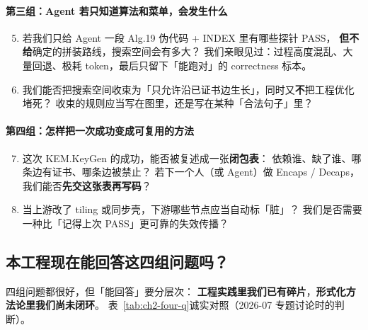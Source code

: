 \documentclass[UTF8,a4paper,11pt]{ctexart}
\theoremstyle{definition}
\theoremstyle{plain}
\theoremstyle{remark}
\numberwithin{figure}{section}
\numberwithin{table}{section}
\begin{document}
\paragraph{第三组：Agent 若只知道算法和菜单，会发生什么}
\begin{enumerate}
  \setcounter{enumi}{4}
  \item 若我们只给 Agent 一段 Alg.19 伪代码 + INDEX 里有哪些探针 PASS，
        \textbf{但不给}确定的拼装路线，搜索空间会有多大？
        我们亲眼见过：过程高度混乱、大量回退、极耗 token，最后只留下「能跑对」的 correctness 标本。
  \item 我们能否把搜索空间收束为「只允许沿已证书边生长」，同时又\textbf{不}把工程优化堵死？
        收束的规则应当写在图里，还是写在某种「合法句子」里？
\end{enumerate}

\paragraph{第四组：怎样把一次成功变成可复用的方法}
\begin{enumerate}
  \setcounter{enumi}{6}
  \item 这次 KEM.KeyGen 的成功，能否被复述成一张\textbf{闭包表}：
        依赖谁、缺了谁、哪条边有证书、哪条边被禁止？
        若下一个人（或 Agent）做 Encaps / Decaps，我们能否\textbf{先交这张表再写码}？
  \item 当上游改了 tiling 或同步壳，下游哪些节点应当自动标「脏」？
        我们是否需要一种比「记得上次 PASS」更可靠的失效传播？
\end{enumerate}

\subsection{本工程现在能回答这四组问题吗？}

四组问题都很好，但「能回答」要分层次：
\textbf{工程实践里我们已有碎片}，\textbf{形式化方法论里我们尚未闭环}。
表~\ref{tab:ch2-four-q}诚实对照（2026-07 专题讨论时的判断）。
\end{document}
